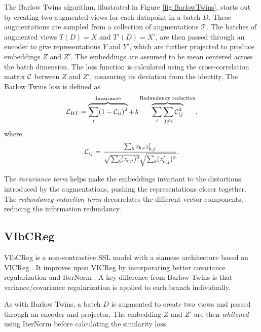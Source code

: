 \documentclass[../../thesis.tex]{subfiles}
\begin{document}
The Barlow Twins algorithm, illustrated in Figure \ref{fig:BarlowTwins}, starts out by creating two augmented views for each datapoint in a batch $D$. These augmentations are sampled from a collection of augmentations $\mathcal{T}$. The batches of augmented views $T(D) = X$ and $T'(D) =X'$, are then passed through an encoder to give representations $Y$ and $Y'$, which are further projected to produce embeddings $Z$ and $Z'$. The embeddings are assumed to be mean centered across the batch dimension. The loss function is calculated using the cross-correlation matrix $\mathcal{C}$ between $Z$ and $Z'$, measuring its deviation from the identity. The Barlow Twins loss is defined as
\begin{equation}
    \label{eq:BTLoss}
    \mathcal{L}_{\text{BT}} = 
    \overbrace{\sum_i (1 - \mathcal{C}_{ii})^2}^{\text{Invariance}}
    +\lambda  \overbrace{\sum_i\sum_{j\neq i} \mathcal{C}_{ij}^2}^{\text{Redundancy reduction}},
\end{equation}
where
\begin{equation}
    \mathcal{C}_{ij} = \frac{\sum_b z_{b,i}z_{b,j}'}{\sqrt{\sum_b (z_{b,i})^2}\sqrt{\sum_b (z_{b,j}')^2}}.
\end{equation}

The \textit{invariance term} helps make the embeddings invariant to the distortions introduced by the augmentations, pushing the representations closer together. The \textit{redundancy reduction term} decorrelates the different vector components, reducing the information redundancy.\newline

\subsection{VIbCReg}

VIbCReg \cite{lee2024vibcreg} is a non-contrastive SSL model with a siamese architecture based on VICReg \cite{bardes2022vicreg}. It improves upon VICReg by incorporating better covariance regularization and IterNorm \cite{huang2019iterative}. A key difference from Barlow Twins is that variance/covariance regularization is applied to each branch individually.\newline

As with Barlow Twins, a batch $D$ is augmented to create two views and passed through an encoder and projector. The embedding $Z$ and $Z'$ are then \textit{whitened} using IterNorm \cite{huang2019iterative} before calculating the similarity loss.\newline
\end{document}
